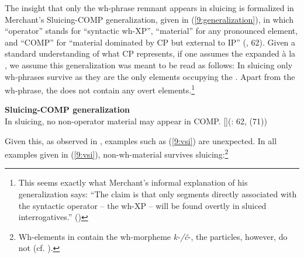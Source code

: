 \documentclass[output=paper,modfonts,newtxmath,hidelinks]{langscibook}
\begin{document}
The insight that only the wh-phrase remnant appears in sluicing is formalized in Merchant's Sluicing-COMP generalization, given in (\ref{9:generalization}), in which ``operator'' stands for ``syntactic wh-XP'', ``material'' for any pronounced element, and ``COMP'' for ``material dominated by CP but external to IP'' (\citealt{merchant2001}, 62). Given a standard understanding of what CP represents, if one assumes the expanded  \`{a} la \cite{rizzi1997}, we assume this generalization was meant to be read as follows: In sluicing only wh-phrases survive  as they are the only elements occupying the . Apart from the wh-phrase, the  does not contain any overt elements.\footnote{This seems exactly what Merchant's informal explanation of his generalization says: ``The claim is that only segments directly associated with the syntactic operator -- the wh-XP -- will be found overtly in sluiced interrogatives.'' (\citealt[62]{merchant2001})}

\begin{exe}
\ex\label{9:generalization} \textbf{Sluicing-COMP generalization}\\
In sluicing, no non-operator material may appear in COMP.\vspace{-3pt}
\exi{}[]{\hfill(\citealt{merchant2001}: 62, (71))}
\end{exe}

\largerpage
\noindent Given this, as observed in \cite{marusicetal2015}, examples such as (\ref{9:vsi}) are unexpected. In all examples given in (\ref{9:vsi}), non-wh-material survives sluicing:\footnote{Wh-elements in  contain the wh-morpheme \textit{k-/č}-, the particles, however, do not (cf. \citealt{marusicetal2015}).}
\end{document}
